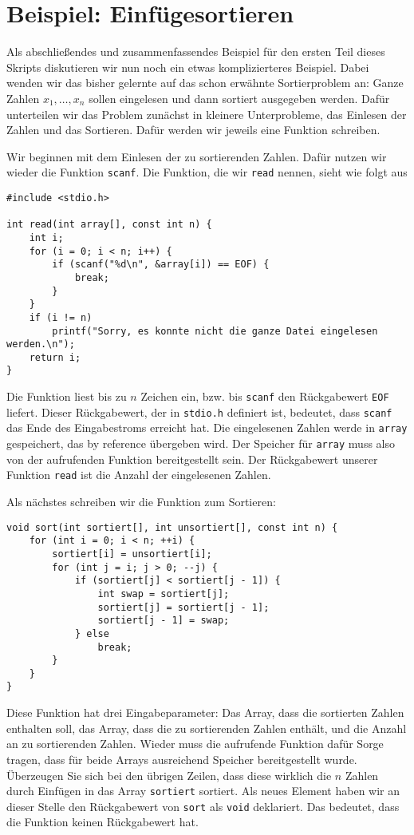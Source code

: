 \section{Beispiel: Einfügesortieren}

Als abschließendes und zusammenfassendes Beispiel für den ersten Teil dieses Skripts diskutieren wir nun noch ein etwas komplizierteres Beispiel.
Dabei wenden wir das bisher gelernte auf das schon erwähnte Sortierproblem an:
Ganze Zahlen $x_1, \ldots, x_n$ sollen eingelesen und dann sortiert ausgegeben werden.
Dafür unterteilen wir das Problem zunächst in kleinere Unterprobleme, das Einlesen der Zahlen und das Sortieren.
Dafür werden wir jeweils eine Funktion schreiben.

Wir beginnen mit dem Einlesen der zu sortierenden Zahlen.
Dafür nutzen wir wieder die Funktion \verb|scanf|.
Die Funktion, die wir \verb|read| nennen, sieht wie folgt aus
\begin{lstlisting}
#include <stdio.h>

int read(int array[], const int n) {
    int i;
    for (i = 0; i < n; i++) {
        if (scanf("%d\n", &array[i]) == EOF) {
            break;
        }
    }
    if (i != n)
        printf("Sorry, es konnte nicht die ganze Datei eingelesen werden.\n");
    return i;
}
\end{lstlisting}
Die Funktion liest bis zu $n$ Zeichen ein, bzw. bis \verb|scanf| den Rückgabewert \verb|EOF| liefert.
Dieser Rückgabewert, der in \verb|stdio.h| definiert ist, bedeutet, dass \verb|scanf| das Ende des Eingabestroms erreicht hat.
Die eingelesenen Zahlen werde in \verb|array| gespeichert, das by reference übergeben wird.
Der Speicher für \verb|array| muss also von der aufrufenden Funktion bereitgestellt sein.
Der Rückgabewert unserer Funktion \verb|read| ist die Anzahl der eingelesenen Zahlen.

Als nächstes schreiben wir die Funktion zum Sortieren:
\begin{lstlisting}
void sort(int sortiert[], int unsortiert[], const int n) {
    for (int i = 0; i < n; ++i) {
        sortiert[i] = unsortiert[i];
        for (int j = i; j > 0; --j) {
            if (sortiert[j] < sortiert[j - 1]) {
                int swap = sortiert[j];
                sortiert[j] = sortiert[j - 1];
                sortiert[j - 1] = swap;
            } else
                break;
        }
    }
}
\end{lstlisting}
Diese Funktion hat drei Eingabeparameter: Das Array, dass die sortierten Zahlen enthalten soll, das Array, dass die zu sortierenden Zahlen enthält, und die Anzahl an zu sortierenden Zahlen.
Wieder muss die aufrufende Funktion dafür Sorge tragen, dass für beide Arrays ausreichend Speicher bereitgestellt wurde.
Überzeugen Sie sich bei den übrigen Zeilen, dass diese wirklich die $n$ Zahlen durch Einfügen in das Array \verb|sortiert| sortiert.
Als neues Element haben wir an dieser Stelle den Rückgabewert von \verb|sort| als \verb|void| deklariert.
Das bedeutet, dass die Funktion keinen Rückgabewert hat.

